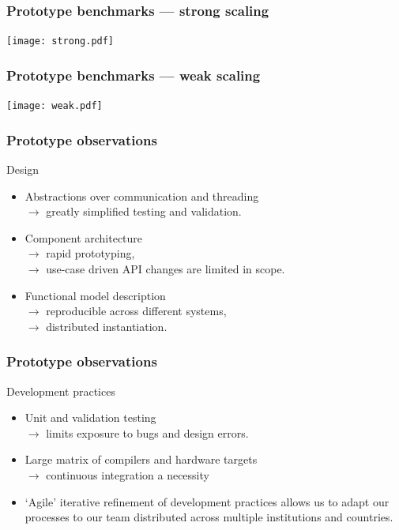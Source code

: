 \documentclass[aspectratio=43,12pt]{beamer}
\newcommand{\subheading}[1]{{\large #1}}
\begin{document}
\begin{frame}
\frametitle{Prototype benchmarks --- strong scaling}
\texttt{[image: strong.pdf]}

\vfill
\end{frame}

\begin{frame}
\frametitle{Prototype benchmarks --- weak scaling}
\texttt{[image: weak.pdf]}

\vfill
\end{frame}

\begin{frame}
\frametitle{Prototype observations}
\subheading{Design}

\vfill
\begin{itemize}
\item Abstractions over communication and threading\\
\hspace{5mm} $\to$ greatly simplified testing and validation.
\item Component architecture\\
\hspace{5mm} $\to$ rapid prototyping,\\
\hspace{5mm} $\to$ use-case driven API changes are limited in scope.
\item Functional model description\\
\hspace{5mm} $\to$ reproducible across different systems,\\
\hspace{5mm} $\to$ distributed instantiation.
\end{itemize}
\vfill
\end{frame}

\begin{frame}
\frametitle{Prototype observations}
\subheading{Development practices}

\vfill
\begin{itemize}
\item Unit and validation testing\\
\hspace{5mm} $\to$ limits exposure to bugs and design errors.
\item Large matrix of compilers and hardware targets\\
\hspace{5mm} $\to$ continuous integration a necessity\\
\item `Agile' iterative refinement of development practices allows us
to adapt our processes to our team distributed across multiple institutions and countries.
\end{itemize}

\vfill
\end{frame}
\end{document}
